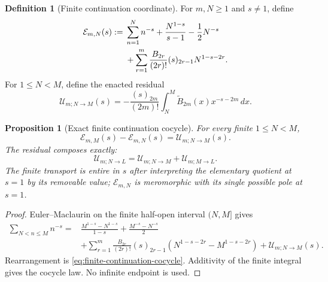 \documentclass[11pt,a4paper]{article}
\newtheorem{proposition}[theorem]{Proposition}
\theoremstyle{definition}
\newtheorem{definition}[theorem]{Definition}
\newcommand{\Continuation}{\mathcal{E}}
\begin{document}
\begin{definition}[Finite continuation coordinate]
\label{def:finite-continuation-coordinate}
For $m,N\geq1$ and $s\neq1$, define
\begin{align}
  \Continuation_{m,N}(s)
  :={}&
  \sum_{n=1}^{N}n^{-s}
  +\frac{N^{1-s}}{s-1}
  -\frac12N^{-s}\notag\\
  &+
  \sum_{r=1}^{m}
  \frac{B_{2r}}{(2r)!}(s)_{2r-1}N^{1-s-2r}.
\label{eq:finite-continuation-coordinate}
\end{align}
For $1\leq N<M$, define the enacted residual
\begin{equation}
\label{eq:finite-continuation-residual}
  \mathcal U_{m;N\to M}(s)
  =
  -\frac{(s)_{2m}}{(2m)!}
  \int_N^M
  \widetilde B_{2m}(x)x^{-s-2m}\,dx.
\end{equation}
\end{definition}

\begin{proposition}[Exact finite continuation cocycle]
\label{prop:finite-continuation-cocycle}
For every finite $1\leq N<M$,
\begin{equation}
\label{eq:finite-continuation-cocycle}
  \Continuation_{m,M}(s)-\Continuation_{m,N}(s)
  =\mathcal U_{m;N\to M}(s).
\end{equation}
The residual composes exactly:
\[
  \mathcal U_{m;N\to L}
  =
  \mathcal U_{m;N\to M}
  +\mathcal U_{m;M\to L}.
\]
The finite transport is entire in $s$ after interpreting the elementary
quotient at $s=1$ by its removable value; $\Continuation_{m,N}$ is meromorphic
with its single possible pole at $s=1$.
\end{proposition}

\begin{proof}
Euler--Maclaurin on the finite half-open interval $(N,M]$ gives
\begin{align*}
\sum_{N<n\leq M}n^{-s}
={}&
\frac{M^{1-s}-N^{1-s}}{1-s}
+\frac{M^{-s}-N^{-s}}2\\
&+\sum_{r=1}^{m}
\frac{B_{2r}}{(2r)!}(s)_{2r-1}
\left(N^{1-s-2r}-M^{1-s-2r}\right)
+\mathcal U_{m;N\to M}(s).
\end{align*}
Rearrangement is \cref{eq:finite-continuation-cocycle}. Additivity of the
finite integral gives the cocycle law. No infinite endpoint is used.
\end{proof}
\end{document}
